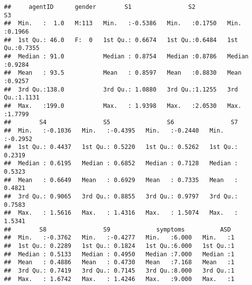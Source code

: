 \documentclass[]{article}
\newenvironment{Shaded}{\begin{snugshade}}{\end{snugshade}}
\newcommand{\KeywordTok}[1]{\textcolor[rgb]{0.13,0.29,0.53}{\textbf{#1}}}
\newcommand{\DecValTok}[1]{\textcolor[rgb]{0.00,0.00,0.81}{#1}}
\newcommand{\StringTok}[1]{\textcolor[rgb]{0.31,0.60,0.02}{#1}}
\newcommand{\CommentTok}[1]{\textcolor[rgb]{0.56,0.35,0.01}{\textit{#1}}}
\newcommand{\OperatorTok}[1]{\textcolor[rgb]{0.81,0.36,0.00}{\textbf{#1}}}
\newcommand{\NormalTok}[1]{#1}
\begin{document}
\begin{Shaded}
\end{Shaded}

\begin{verbatim}
##     agentID      gender        S1                S2               S3        
##  Min.   :  1.0   M:113   Min.   :-0.5386   Min.   :0.1750   Min.   :0.1966  
##  1st Qu.: 46.0   F:  0   1st Qu.: 0.6674   1st Qu.:0.6484   1st Qu.:0.7355  
##  Median : 91.0           Median : 0.8754   Median :0.8786   Median :0.9284  
##  Mean   : 93.5           Mean   : 0.8597   Mean   :0.8830   Mean   :0.9257  
##  3rd Qu.:138.0           3rd Qu.: 1.0880   3rd Qu.:1.1255   3rd Qu.:1.1131  
##  Max.   :199.0           Max.   : 1.9398   Max.   :2.0530   Max.   :1.7799  
##        S4                S5                S6                S7         
##  Min.   :-0.1036   Min.   :-0.4395   Min.   :-0.2440   Min.   :-0.2952  
##  1st Qu.: 0.4437   1st Qu.: 0.5220   1st Qu.: 0.5262   1st Qu.: 0.2319  
##  Median : 0.6195   Median : 0.6852   Median : 0.7128   Median : 0.5323  
##  Mean   : 0.6649   Mean   : 0.6929   Mean   : 0.7335   Mean   : 0.4821  
##  3rd Qu.: 0.9065   3rd Qu.: 0.8855   3rd Qu.: 0.9797   3rd Qu.: 0.7583  
##  Max.   : 1.5616   Max.   : 1.4316   Max.   : 1.5074   Max.   : 1.5341  
##        S8                S9             symptoms          ASD   
##  Min.   :-0.3762   Min.   :-0.4277   Min.   :6.000   Min.   :1  
##  1st Qu.: 0.2289   1st Qu.: 0.1824   1st Qu.:6.000   1st Qu.:1  
##  Median : 0.5133   Median : 0.4950   Median :7.000   Median :1  
##  Mean   : 0.4886   Mean   : 0.4730   Mean   :7.168   Mean   :1  
##  3rd Qu.: 0.7419   3rd Qu.: 0.7145   3rd Qu.:8.000   3rd Qu.:1  
##  Max.   : 1.6742   Max.   : 1.4246   Max.   :9.000   Max.   :1
\end{verbatim}

\begin{Shaded}
\end{Shaded}
\end{document}
